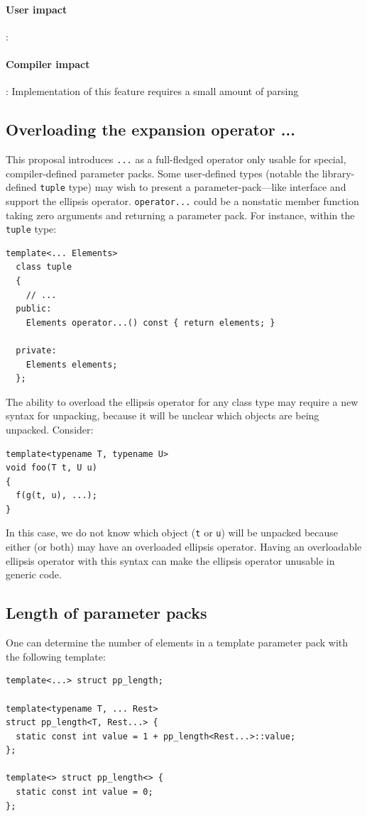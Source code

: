 \documentclass{article}
\begin{document}
\paragraph{User impact}: 

\paragraph{Compiler impact}: Implementation of this feature requires a
small amount of parsing 

\subsection{Overloading the expansion operator ...}
This proposal introduces \texttt{...} as a full-fledged operator only
usable for special, compiler-defined parameter packs. Some
user-defined types (notable the library-defined \texttt{tuple} type)
may wish to present a parameter-pack---like interface and support the
ellipsis operator. \texttt{operator...} could be a nonstatic member
function taking zero arguments and returning a parameter pack. For
instance, within the \texttt{tuple} type:

\begin{verbatim}
template<... Elements>
  class tuple 
  {
    // ...
  public:
    Elements operator...() const { return elements; }

  private:
    Elements elements;
  };
\end{verbatim}

The ability to overload the ellipsis operator for any class type may
require a new syntax for unpacking, because it will be unclear which
objects are being unpacked. Consider:

\begin{verbatim}
template<typename T, typename U>
void foo(T t, U u)
{
  f(g(t, u), ...);
}
\end{verbatim}

In this case, we do not know which object (\texttt{t} or \texttt{u})
will be unpacked because either (or both) may have an overloaded
ellipsis operator. Having an overloadable ellipsis operator with this
syntax can make the ellipsis operator unusable in generic code.

\subsection{Length of parameter packs}
\label{sec:pp-size}
One can determine the number of elements in a template parameter pack
with the following template:
\begin{verbatim}
template<...> struct pp_length;

template<typename T, ... Rest>
struct pp_length<T, Rest...> {
  static const int value = 1 + pp_length<Rest...>::value; 
};

template<> struct pp_length<> {
  static const int value = 0;
};
\end{verbatim}
\end{document}
